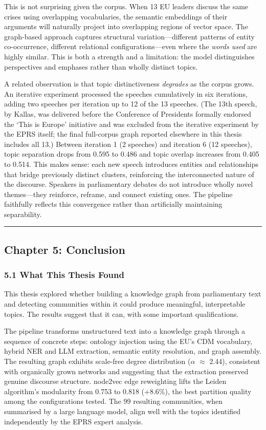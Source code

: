 \documentclass[11pt]{article}
\begin{document}
This is not surprising given the corpus. When 13 EU leaders discuss the same crises using overlapping vocabularies, the semantic embeddings of their arguments will naturally project into overlapping regions of vector space. The graph-based approach captures structural variation---different patterns of entity co-occurrence, different relational configurations---even where the \emph{words used} are highly similar. This is both a strength and a limitation: the model distinguishes perspectives and emphases rather than wholly distinct topics.

A related observation is that topic distinctiveness \emph{degrades} as the corpus grows. An iterative experiment processed the speeches cumulatively in six iterations, adding two speeches per iteration up to 12 of the 13 speeches. (The 13th speech, by Kallas, was delivered before the Conference of Presidents formally endorsed the `This is Europe' initiative and was excluded from the iterative experiment by the EPRS itself; the final full-corpus graph reported elsewhere in this thesis includes all 13.) Between iteration 1 (2 speeches) and iteration 6 (12 speeches), topic separation drops from 0.595 to 0.486 and topic overlap increases from 0.405 to 0.514. This makes sense: each new speech introduces entities and relationships that bridge previously distinct clusters, reinforcing the interconnected nature of the discourse. Speakers in parliamentary debates do not introduce wholly novel themes---they reinforce, reframe, and connect existing ones. The pipeline faithfully reflects this convergence rather than artificially maintaining separability.


\hrule


\subsection{Chapter 5: Conclusion}


\subsubsection{5.1 What This Thesis Found}


This thesis explored whether building a knowledge graph from parliamentary text and detecting communities within it could produce meaningful, interpretable topics. The results suggest that it can, with some important qualifications.

The pipeline transforms unstructured text into a knowledge graph through a sequence of concrete steps: ontology injection using the EU's CDM vocabulary, hybrid NER and LLM extraction, semantic entity resolution, and graph assembly. The resulting graph exhibits scale-free degree distribution ($\alpha$ $\approx$ 2.44), consistent with organically grown networks and suggesting that the extraction preserved genuine discourse structure. node2vec edge reweighting lifts the Leiden algorithm's modularity from 0.753 to 0.818 (+8.6\%), the best partition quality among the configurations tested. The 99 resulting communities, when summarised by a large language model, align well with the topics identified independently by the EPRS expert analysis.
\end{document}

